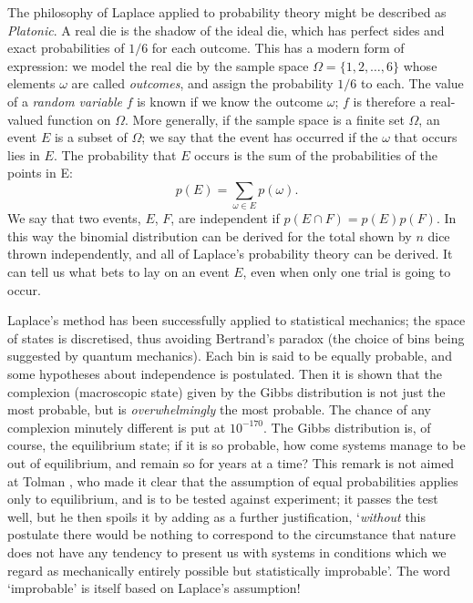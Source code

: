 \documentclass[12pt]{article}
\begin{document}
The philosophy of Laplace applied to probability theory might be described as
{\em Platonic}. A real die is the shadow of the ideal die, which has
perfect sides and exact probabilities of $1/6$ for each outcome. This
has a modern form of expression: we model the real die by the sample space
$\Omega=\{1,2,\ldots,6\}$ whose elements $\omega$ are called {\em outcomes},
and assign the probability $1/6$ to each. The value of a {\em random
variable} $f$ is known if we know the outcome $\omega$; $f$ is
therefore a real-valued function on $\Omega$.
More generally, if the sample space is a finite set $\Omega$, an event $E$
is a subset of $\Omega$; we say that the event has occurred
if the $\omega$ that occurs lies in $E$. The probability that $E$ occurs
is the sum of the probabilities of the points in E:
\begin{equation}
p(E)=\sum_{\omega\in E}p(\omega).
\end{equation}
We say that two events, $E$, $F$, are independent if $p(E\cap F)=p(E)p(F)$.
In this way the binomial distribution can be derived for the total shown
by $n$ dice thrown independently, and all of Laplace's probability theory
can be derived. It can tell us what bets to lay on an event $E$, even
when only one trial is going to occur.

Laplace's method has been
successfully applied to statistical mechanics; the space of states is
discretised, thus avoiding Bertrand's paradox (the choice of
bins being suggested by quantum mechanics). Each bin is said to be
equally probable, and some hypotheses about independence is postulated.
Then it is shown that the complexion (macroscopic state) given by the
Gibbs distribution is not just the most probable, but is {\em
overwhelmingly} the most probable. The chance of any complexion minutely
different is put at $10^{-170}$. The Gibbs distribution is, of course,
the equilibrium state; if it is so probable, how come systems manage to
be out of equilibrium, and remain so for years at a time? This remark
is not aimed at Tolman \cite{Tolman}, who made it clear that the assumption
of equal probabilities applies only to equilibrium, and is to be tested
against experiment; it passes the test well, but he then spoils it by adding
as a further justification, `{\em without} this
postulate there would be nothing to correspond to the circumstance that
nature does not have any tendency to present us with systems in conditions 
which we regard as mechanically entirely possible but statistically
improbable'. The word `improbable' is itself based on Laplace's
assumption!
\end{document}
